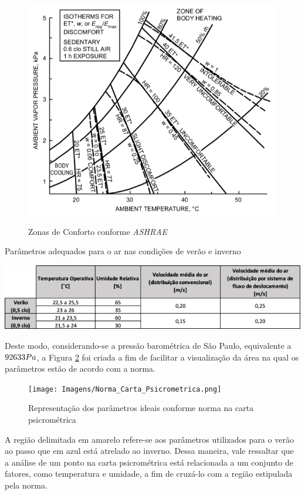 \documentclass[acronym,symbols,table]{fei}
\begin{document}
\begin{figure}[!htb] 
 \centering
    \caption{Zonas de Conforto conforme \textit{ASHRAE}}
    \includegraphics[width=0.8\linewidth]{Imagens/Zonas_Conforto.png}
    \label{fig: Zonas_Conforto}
\end{figure}

\begin{table}[!htb] 
 \centering
    \caption{Parâmetros adequados para o ar nas condições de verão e inverno}
    \includegraphics[width=1.0\linewidth]{Tabelas/Tabela_ABNT.png}
    \label{tab: Parâmetros Ar}
\end{table}

Deste modo, considerando-se a pressão barométrica de São Paulo, equivalente a $92633 \space Pa$, a Figura \ref{fig:Norma_Carta_Psicrometrica} foi criada a fim de facilitar a visualização da área na qual os parâmetros estão de acordo com a norma.

\begin{figure}[!htb] 
 \centering
    \caption{Representação dos parâmetros ideais conforme norma \textcite{abnt216401} na carta psicrométrica}
    \texttt{[image: Imagens/Norma\_Carta\_Psicrometrica.png]}
    \label{fig:Norma_Carta_Psicrometrica}
\end{figure}
\newpage
A região delimitada em amarelo refere-se aos parâmetros utilizados para o verão ao passo que em azul está atrelado ao inverno. Dessa maneira, vale ressaltar que a análise de um ponto na carta psicrométrica está relacionada a um conjunto de fatores, como temperatura e umidade, a fim de cruzá-lo com a região estipulada pela norma.
\end{document}
